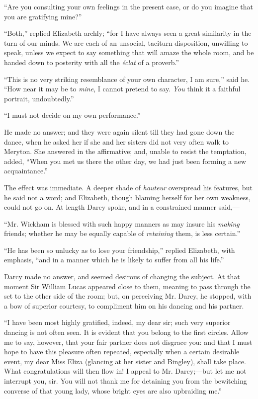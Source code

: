 \documentclass[12pt,openright]{book}
\begin{document}
“Are you consulting your own feelings in the present case, or do you imagine that you are gratifying mine?”

“Both,” replied Elizabeth archly; “for I have always seen a great similarity in the turn of our minds. We are each of an unsocial, taciturn disposition, unwilling to speak, unless we expect to say something that will amaze the whole room, and be handed down to posterity with all the \textit{éclat} of a proverb.”

“This is no very striking resemblance of your own character, I am sure,” said he. “How near it may be to \textit{mine}, I cannot pretend to say. \textit{You} think it a faithful portrait, undoubtedly.”

“I must not decide on my own performance.”

He made no answer; and they were again silent till they had gone down the dance, when he asked her if she and her sisters did not very often walk to Meryton. She answered in the affirmative; and, unable to resist the temptation, added, “When you met us there the other day, we had just been forming a new acquaintance.”

The effect was immediate. A deeper shade of \textit{hauteur} overspread his features, but he said not a word; and Elizabeth, though blaming herself for her own weakness, could not go on. At length Darcy spoke, and in a constrained manner said,—

“Mr. Wickham is blessed with such happy manners as may insure his \textit{making} friends; whether he may be equally capable of \textit{retaining} them, is less certain.”

“He has been so unlucky as to lose your friendship,” replied Elizabeth, with emphasis, “and in a manner which he is likely to suffer from all his life.”

Darcy made no answer, and seemed desirous of changing the subject. At that moment Sir William Lucas appeared close to them, meaning to pass through the set to the other side of the room; but, on perceiving Mr. Darcy, he stopped, with a bow of superior courtesy, to compliment him on his dancing and his partner.

“I have been most highly gratified, indeed, my dear sir; such very superior dancing is not often seen. It is evident that you belong to the first circles. Allow me to say, however, that your fair partner does not disgrace you: and that I must hope to have this pleasure often repeated, especially when a certain desirable event, my dear Miss Eliza (glancing at her sister and Bingley), shall take place. What congratulations will then flow in! I appeal to Mr. Darcy;—but let me not interrupt you, sir. You will not thank me for detaining you from the bewitching converse of that young lady, whose bright eyes are also upbraiding me.”
\end{document}

